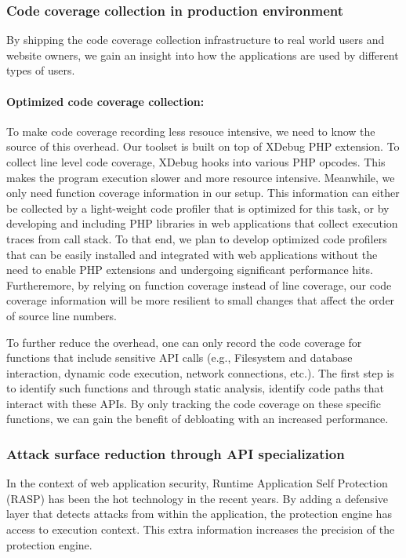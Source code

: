 \subsubsection{Code coverage collection in production environment}
By shipping the code coverage collection infrastructure to real world users and website owners, we gain an insight into how the applications are used by different types of users.

\paragraph{Optimized code coverage collection:} To make code coverage recording less resouce intensive, we need to know the source of this overhead.
Our toolset is built on top of XDebug PHP extension. To collect line level code coverage, XDebug hooks into various PHP opcodes. This makes the program execution slower and more resource intensive. Meanwhile, we only need function coverage information in our setup. This information can either be collected by a light-weight code profiler that is optimized for this task, or by developing and including PHP libraries in web applications that collect execution traces from call stack. To that end, we plan to develop optimized code profilers that can be easily installed and integrated with web applications without the need to enable PHP extensions and undergoing significant performance hits. Furtheremore, by relying on function coverage instead of line coverage, our code coverage information will be more resilient to small changes that affect the order of source line numbers.

To further reduce the overhead, one can only record the code coverage for functions that include sensitive API calls (e.g., Filesystem and database interaction, dynamic code execution, network connections, etc.). The first step is to identify such functions and through static analysis, identify code paths that interact with these APIs. By only tracking the code coverage on these specific functions, we can gain the benefit of debloating with an increased performance.

\subsubsection{Attack surface reduction through API specialization}
In the context of web application security, Runtime Application Self Protection (RASP) has been the hot technology in the recent years. By adding a defensive layer that detects attacks from within the application, the protection engine has access to execution context. This extra information increases the precision of the protection engine.

